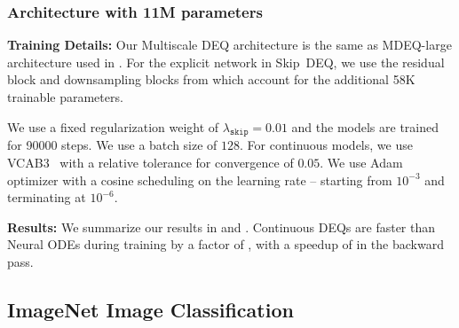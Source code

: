 \subsubsection{Architecture with 11M parameters}

\textbf{Training Details:} Our Multiscale DEQ architecture is the same as MDEQ-large architecture used in \citet{bai_multiscale_2020}. For the explicit network in Skip~DEQ, we use the residual block and downsampling blocks from \citet{bai_multiscale_2020} which account for the additional 58K trainable parameters.

We use a fixed regularization weight of $\lambda_{\texttt{skip}} = 0.01$ and the models are trained for 90000 steps. We use a batch size of $128$. For continuous models, we use VCAB3~\citep{wanner1996solving} with a relative tolerance for convergence of $0.05$. We use Adam~\citep{kingma2014adam} optimizer with a cosine scheduling on the learning rate -- starting from $10^{-3}$ and terminating at $10^{-6}$.

\textbf{Results:} We summarize our results in  and . Continuous DEQs are faster than Neural ODEs during training by a factor of , with a speedup of  in the backward pass.

\subsection{ImageNet Image Classification}
\label{subsec:infinite_time_neural_odes_imagenet_image_classification}

